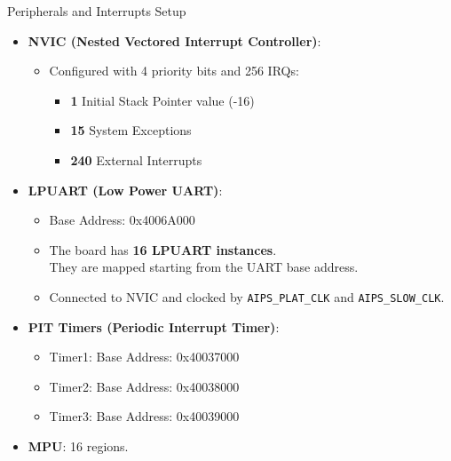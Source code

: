\begin{frame}{Peripherals and Interrupts Setup}
    \begin{itemize}
        \item \textbf{NVIC (Nested Vectored Interrupt Controller)}:
        \begin{itemize}
            \item Configured with 4 priority bits and 256 IRQs:
                \begin{itemize}
                    \item \textbf{1} Initial Stack Pointer value (-16)
                    \item \textbf{15} System Exceptions
                    \item \textbf{240} External Interrupts
                \end{itemize}
        \end{itemize}
        \item \textbf{LPUART (Low Power UART)}:
        \begin{itemize}
            \item Base Address: 0x4006A000
            \item The board has \textbf{16 LPUART instances}.\\ They are mapped starting from the UART base address. 
            \item Connected to NVIC and clocked by \texttt{AIPS\_PLAT\_CLK} and \texttt{AIPS\_SLOW\_CLK}.
        \end{itemize}
        \item \textbf{PIT Timers (Periodic Interrupt Timer)}:
        \begin{itemize}
            \item Timer1: Base Address: 0x40037000
            \item Timer2: Base Address: 0x40038000
            \item Timer3: Base Address: 0x40039000
        \end{itemize}
        \item \textbf{MPU}: 16 regions.
    \end{itemize}
\end{frame}

